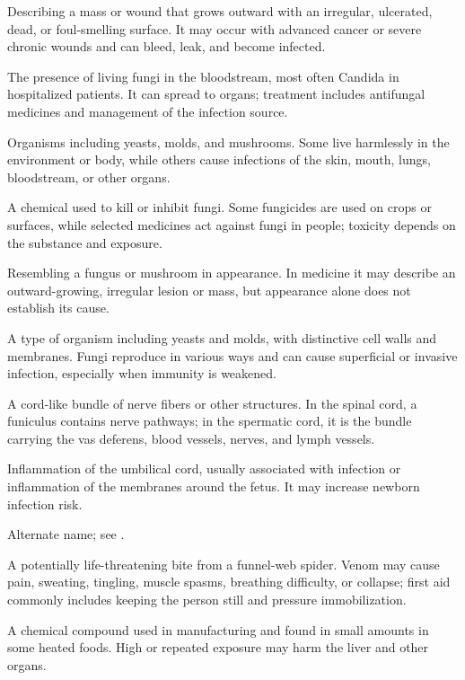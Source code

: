  Describing a mass or wound that grows outward with an irregular, ulcerated, dead, or foul-smelling surface. It may occur with advanced cancer or severe chronic wounds and can bleed, leak, and become infected.

 The presence of living fungi in the bloodstream, most often Candida in hospitalized patients. It can spread to organs; treatment includes antifungal medicines and management of the infection source.

 Organisms including yeasts, molds, and mushrooms. Some live harmlessly in the environment or body, while others cause infections of the skin, mouth, lungs, bloodstream, or other organs.

 A chemical used to kill or inhibit fungi. Some fungicides are used on crops or surfaces, while selected medicines act against fungi in people; toxicity depends on the substance and exposure.

 Resembling a fungus or mushroom in appearance. In medicine it may describe an outward-growing, irregular lesion or mass, but appearance alone does not establish its cause.

 A type of organism including yeasts and molds, with distinctive cell walls and membranes. Fungi reproduce in various ways and can cause superficial or invasive infection, especially when immunity is weakened.

 A cord-like bundle of nerve fibers or other structures. In the spinal cord, a funiculus contains nerve pathways; in the spermatic cord, it is the bundle carrying the vas deferens, blood vessels, nerves, and lymph vessels.

 Inflammation of the umbilical cord, usually associated with infection or inflammation of the membranes around the fetus. It may increase newborn infection risk.

 Alternate name; see .

 A potentially life-threatening bite from a funnel-web spider. Venom may cause pain, sweating, tingling, muscle spasms, breathing difficulty, or collapse; first aid commonly includes keeping the person still and pressure immobilization.

 A chemical compound used in manufacturing and found in small amounts in some heated foods. High or repeated exposure may harm the liver and other organs.


